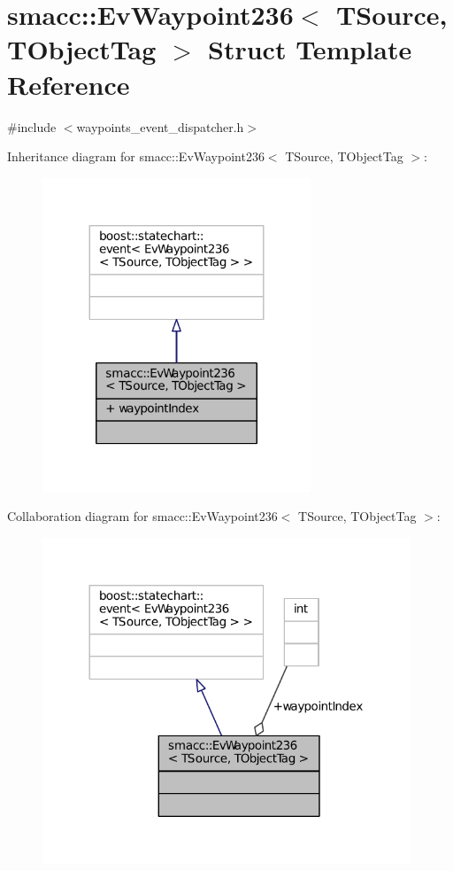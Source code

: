 \hypertarget{structsmacc_1_1EvWaypoint236}{}\section{smacc\+:\+:Ev\+Waypoint236$<$ T\+Source, T\+Object\+Tag $>$ Struct Template Reference}
\label{structsmacc_1_1EvWaypoint236}


{\ttfamily \#include $<$waypoints\+\_\+event\+\_\+dispatcher.\+h$>$}



Inheritance diagram for smacc\+:\+:Ev\+Waypoint236$<$ T\+Source, T\+Object\+Tag $>$\+:
\nopagebreak
\begin{figure}[H]
\begin{center}
\leavevmode
\includegraphics[width=227pt]{structsmacc_1_1EvWaypoint236__inherit__graph}
\end{center}
\end{figure}


Collaboration diagram for smacc\+:\+:Ev\+Waypoint236$<$ T\+Source, T\+Object\+Tag $>$\+:
\nopagebreak
\begin{figure}[H]
\begin{center}
\leavevmode
\includegraphics[width=312pt]{structsmacc_1_1EvWaypoint236__coll__graph}
\end{center}
\end{figure}
